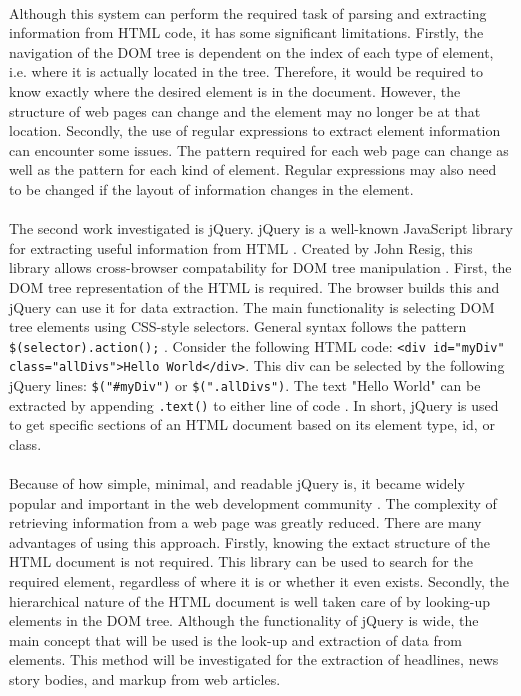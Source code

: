 \documentclass[11pt,titlepage]{report}
\begin{document}
\paragraph{}
Although this system can perform the required task of parsing and extracting information from HTML code, it has some significant limitations. Firstly, the navigation of the DOM tree is dependent on the index of each type of element, i.e. where it is actually located in the tree. Therefore, it would be required to know exactly where the desired element is in the document. However, the structure of web pages can change and the element may no longer be at that location. Secondly, the use of regular expressions to extract element information can encounter some issues. The pattern required for each web page can change as well as the pattern for each kind of element. Regular expressions may also need to be changed if the layout of information changes in the element. 
\paragraph{}
The second work investigated is jQuery. jQuery is a well-known JavaScript library for extracting useful information from HTML \cite{jquery}. Created by John Resig, this library allows cross-browser compatability for DOM tree manipulation \cite{practical_jquery}. First, the DOM tree representation of the HTML is required. The browser builds this and jQuery can use it for data extraction. The main functionality is selecting DOM tree elements using CSS-style selectors. General syntax follows the pattern \lstinline|$(selector).action();| \cite{practical_jquery}. Consider the following HTML code: \lstinline|<div id="myDiv" class="allDivs">Hello World</div>|. This div can be selected by the following jQuery lines: \lstinline|$("#myDiv")| or \lstinline|$(".allDivs")|. The text "Hello World" can be extracted by appending \lstinline|.text()| to either line of code \cite{jquery_text}. In short, jQuery is used to get specific sections of an HTML document based on its element type, id, or class. 
\paragraph{}
Because of how simple, minimal, and readable jQuery is, it became widely popular and important in the web development community \cite{practical_jquery}. The complexity of retrieving information from a web page was greatly reduced. There are many advantages of using this approach. Firstly, knowing the extact structure of the HTML document is not required. This library can be used to search for the required element, regardless of where it is or whether it even exists. Secondly, the hierarchical nature of the HTML document is well taken care of by looking-up elements in the DOM tree. Although the functionality of jQuery is wide, the main concept that will be used is the look-up and extraction of data from elements. This method will be investigated for the extraction of headlines, news story bodies, and markup from web articles. 
\end{document}
